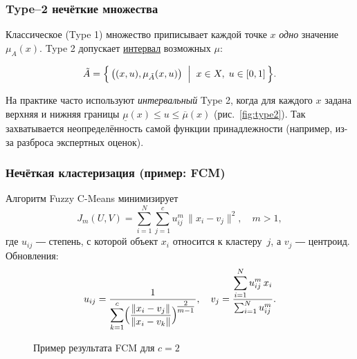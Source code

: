 \subsubsection{Type–2 нечёткие множества}

Классическое (Type 1) множество
приписывает каждой точке $x$ \emph{одно} значение $\mu_A(x)$.
Type 2 допускает \underline{интервал} возможных $\mu$:

\[
  \tilde A
  = \Bigl\{\,\bigl((x,u),\mu_{\tilde A}(x,u)\bigr)
     \;\Bigm|\;
     x\in X,\;u\in[0,1]\,\Bigr\}.
\]

На практике часто используют
\emph{интервальный} Type 2,
когда для каждого $x$ задана верхняя и нижняя границы
\(
  \underline\mu(x)\le u\le\overline\mu(x)
\)
(рис.~\ref{fig:type2}).  
Так захватывается неопределённость
самой функции принадлежности
(например, из-за разброса экспертных оценок).

\subsubsection{Нечёткая кластеризация (пример: FCM)}

Алгоритм Fuzzy C-Means минимизирует
\begin{equation}
  J_m(U,V) =
  \sum_{i=1}^N \sum_{j=1}^c
    u_{ij}^m\,\lVert x_i - v_j\rVert^2,
  \quad m>1,
\end{equation}
где $u_{ij}$ ― степень,
с которой объект $x_i$ относится к кластеру~$j$,
а $v_j$ ― центроид.  
Обновления:
\[
  u_{ij}
  = \frac{1}{\displaystyle
      \sum_{k=1}^c
      \Bigl(\frac{\lVert x_i-v_j\rVert}{\lVert x_i-v_k\rVert}\Bigr)^{\!\tfrac{2}{m-1}}},
  \quad
  v_j
  = \frac{\displaystyle
      \sum_{i=1}^N u_{ij}^m\,x_i}{
      \sum_{i=1}^N u_{ij}^m}.
\]

\begin{figure}[h]
\centering
{}
\caption{Пример результата FCM для $c=2$}
\label{fig:fcm}
\end{figure}

